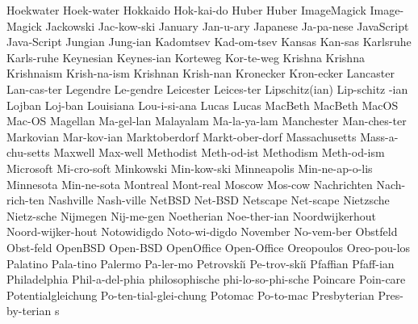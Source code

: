 \1 Hoekwater		Hoek-water		%
\1 Hokkaido		Hok-kai-do
\1 Huber		Huber			%
\1 ImageMagick		Image-Magick		%
\1 Jackowski		Jac-kow-ski		%
\1 January		Jan-u-ary
\1 Japanese		Ja-pa-nese
\1 JavaScript		Java-Script		%
\1 Jungian		Jung-ian		%
\1 Kadomtsev		Kad-om-tsev
\1 Kansas		Kan-sas
\1 Karlsruhe		Karls-ruhe
\1 Keynesian		Keynes-ian		%
\1 Korteweg		Kor-te-weg
\1 Krishna		Krishna
\1 Krishnaism		Krish-na-ism
\1 Krishnan		Krish-nan		%
\1 Kronecker		Kron-ecker		%
\1 Lancaster		Lan-cas-ter
\1 Legendre		Le-gendre
\1 Leicester		Leices-ter
\2 Lipschitz(ian)	Lip-schitz -ian
\1 Lojban		Loj-ban		%
\1 Louisiana		Lou-i-si-ana
\1 Lucas		Lucas			%
\1 MacBeth		MacBeth			%
\1 MacOS		Mac-OS			%
\1 Magellan		Ma-gel-lan		%
\1 Malayalam		Ma-la-ya-lam		%
\1 Manchester		Man-ches-ter
\1 Markovian		Mar-kov-ian
\1 Marktoberdorf	Markt-ober-dorf  %
\1 Massachusetts	Mass-a-chu-setts
\1 Maxwell		Max-well		%
\1 Methodist		Meth-od-ist		%
\1 Methodism		Meth-od-ism		%
\1 Microsoft		Mi-cro-soft		%
\1 Minkowski		Min-kow-ski		%
\1 Minneapolis		Min-ne-ap-o-lis
\1 Minnesota		Min-ne-sota
\1 Montreal		Mont-real		%
\1 Moscow		Mos-cow
\1 Nachrichten          Nach-rich-ten
\1 Nashville		Nash-ville
\1 NetBSD		Net-BSD 		%
\1 Netscape		Net-scape		%
\1 Nietzsche		Nietz-sche		%
\1 Nijmegen		Nij-me-gen
\1 Noetherian		Noe-ther-ian
\1 Noordwijkerhout	Noord-wijker-hout
\1 Notowidigdo		Noto-wi-digdo		%
\1 November		No-vem-ber
\1 Obstfeld		Obst-feld		%
\1 OpenBSD		Open-BSD		%
\1 OpenOffice		Open-Office		%
\1 Oreopoulos		Oreo-pou-los		%
\1 Palatino		Pala-tino		%
\1 Palermo		Pa-ler-mo
\1 Petrovski\u\i{}	Pe-trov-ski\u\i{}	%
\1 Pfaffian		Pfaff-ian		%
\1 Philadelphia		Phil-a-del-phia
\1 philosophische       phi-lo-so-phi-sche	%
\1 Poincare		Poin-care
\1 Potentialgleichung	Po-ten-tial-glei-chung
\1 Potomac		Po-to-mac		%
\5 Presbyterian		Pres-by-terian s	%
